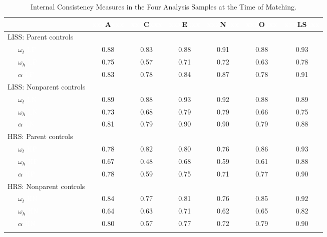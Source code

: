 \documentclass[
  english,
  man,floatsintext]{apa7}
\begin{document}
\begin{table}[h]

\begin{center}
\begin{threeparttable}

\caption{\label{tab:int-consist}Internal Consistency Measures in the Four Analysis Samples at the Time of Matching.}

\begin{tabular}{lcccccc}
\toprule
 & \multicolumn{1}{c}{\textcolor{white}{xxx}A\textcolor{white}{xxx}} & \multicolumn{1}{c}{\textcolor{white}{xxx}C\textcolor{white}{xxx}} & \multicolumn{1}{c}{\textcolor{white}{xxx}E\textcolor{white}{xxx}} & \multicolumn{1}{c}{\textcolor{white}{xxx}N\textcolor{white}{xxx}} & \multicolumn{1}{c}{\textcolor{white}{xxx}O\textcolor{white}{xxx}} & \multicolumn{1}{c}{\textcolor{white}{xxx}LS\textcolor{white}{xxx}}\\
\midrule
LISS: Parent controls &  &  &  &  &  & \\
\ \ \ ${\omega}_{t}$ \textcolor{white}{LP} & 0.88 & 0.83 & 0.88 & 0.91 & 0.88 & 0.93\\
\ \ \ ${\omega}_{h}$ \textcolor{white}{LP} & 0.75 & 0.57 & 0.71 & 0.72 & 0.63 & 0.78\\
\ \ \ ${\alpha}$ \textcolor{white}{LP} & 0.83 & 0.78 & 0.84 & 0.87 & 0.78 & 0.91\\
LISS: Nonparent controls &  &  &  &  &  & \\
\ \ \ ${\omega}_{t}$ \textcolor{white}{LN} & 0.89 & 0.88 & 0.93 & 0.92 & 0.88 & 0.89\\
\ \ \ ${\omega}_{h}$ \textcolor{white}{LN} & 0.73 & 0.68 & 0.79 & 0.79 & 0.66 & 0.75\\
\ \ \ ${\alpha}$ \textcolor{white}{LN} & 0.81 & 0.79 & 0.90 & 0.90 & 0.79 & 0.88\\
HRS: Parent controls &  &  &  &  &  & \\
\ \ \ ${\omega}_{t}$ \textcolor{white}{HP} & 0.78 & 0.82 & 0.80 & 0.76 & 0.86 & 0.93\\
\ \ \ ${\omega}_{h}$ \textcolor{white}{HP} & 0.67 & 0.48 & 0.68 & 0.59 & 0.61 & 0.88\\
\ \ \ ${\alpha}$ \textcolor{white}{HP} & 0.78 & 0.59 & 0.75 & 0.71 & 0.77 & 0.90\\
HRS: Nonparent controls &  &  &  &  &  & \\
\ \ \ ${\omega}_{t}$ \textcolor{white}{HN} & 0.84 & 0.77 & 0.81 & 0.76 & 0.85 & 0.92\\
\ \ \ ${\omega}_{h}$ \textcolor{white}{HN} & 0.64 & 0.63 & 0.71 & 0.62 & 0.65 & 0.82\\
\ \ \ ${\alpha}$ \textcolor{white}{HN} & 0.80 & 0.57 & 0.77 & 0.72 & 0.79 & 0.90\\
\bottomrule
\addlinespace
\end{tabular}


\end{threeparttable}
\end{center}
\end{table}
\end{document}
